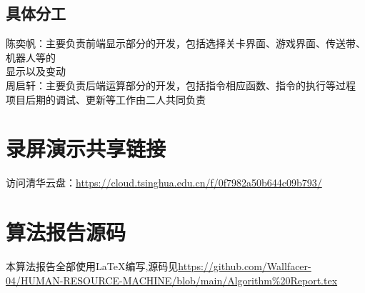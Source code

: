 \documentclass{report}
\begin{document}
    \section{具体分工}\noindent
    陈奕帆：\;主要负责前端显示部分的开发，包括选择关卡界面、游戏界面、传送带、机器人等的\\\hspace*{4em}显示以及变动\\
    周启轩：\;主要负责后端运算部分的开发，包括指令相应函数、指令的执行等过程\vspace{0.5em}\\
    项目后期的调试、更新等工作由二人共同负责
    

    \chapter{录屏演示共享链接}
    访问清华云盘：\href{https://cloud.tsinghua.edu.cn/f/0f7982a50b644c09b793/}{https://cloud.tsinghua.edu.cn/f/0f7982a50b644c09b793/}


    \chapter{算法报告源码}
    本算法报告全部使用\LaTeX 编写,源码见\href{https://github.com/Wallfacer-04/HUMAN-RESOURCE-MACHINE/blob/main/Algorithm%20Report.tex}{https://github.com/Wallfacer-04/HUMAN-RESOURCE-MACHINE/blob/main/Algorithm\%20Report.tex}
    
\end{document}
